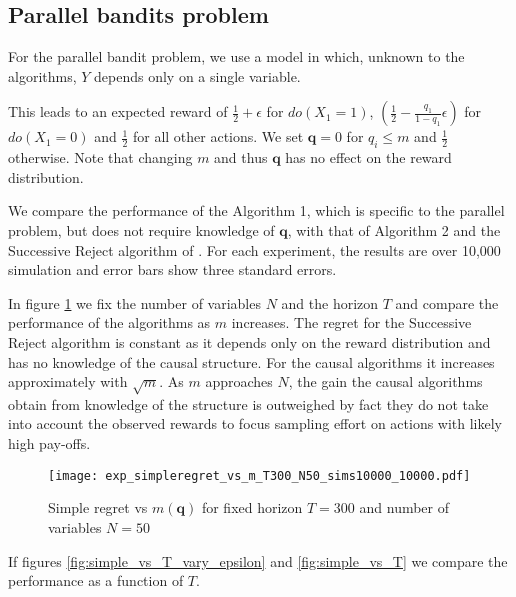 \subsection{Parallel bandits problem}

For the parallel bandit problem, we use a model in which, unknown to the algorithms, $Y$ depends only on a single variable.

This leads to an expected reward of $\frac{1}{2}+\epsilon$ for $do(X_1=1)$, $\left(\frac{1}{2}-\frac{q_1}{1-q_1}\epsilon\right)$ for $do(X_1=0)$ and $\frac{1}{2}$ for all other actions. We set $\boldsymbol{q} = 0$ for $q_i \leq m$ and $\frac{1}{2}$ otherwise. Note that changing $m$ and thus $\boldsymbol{q}$ has no effect on the reward distribution. 

We compare the performance of the Algorithm 1, which is specific to the parallel problem, but does not require knowledge of $\boldsymbol{q}$, with that of Algorithm 2 and the Successive Reject algorithm of \cite{}. For each experiment, the results are over 10,000 simulation and error bars show three standard errors.

In figure \ref{fig:simple_vs_m} we fix the number of variables $N$ and the horizon $T$ and compare the performance of the algorithms as $m$ increases. The regret for the Successive Reject algorithm is constant as it depends only on the reward distribution and has no knowledge of the causal structure. For the causal algorithms it increases approximately with $\sqrt{m}$. As $m$ approaches $N$, the gain the causal algorithms obtain from knowledge of the structure is outweighed by fact they do not take into account the observed rewards to focus sampling effort on actions with likely high pay-offs.

\begin{figure}[h]
\caption{Simple regret vs $m(\boldsymbol{q})$ for fixed horizon $T=300$ and number of variables $N = 50$}
\label{fig:simple_vs_m}
\centering
\texttt{[image: exp\_simpleregret\_vs\_m\_T300\_N50\_sims10000\_10000.pdf]}
\end{figure}

If figures \ref{fig:simple_vs_T_vary_epsilon} and \ref{fig:simple_vs_T} we compare the performance as a function of $T$. 

